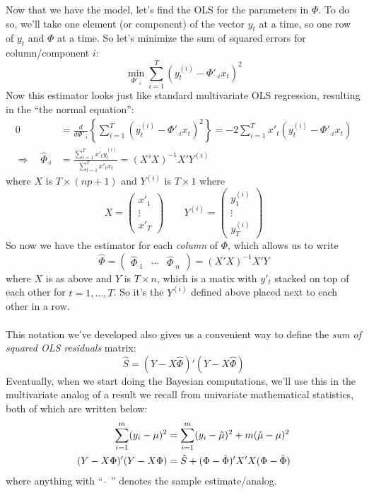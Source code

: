 \documentclass[a4paper,12pt]{scrartcl}
\begin{document}
Now that we have the model, let's find the OLS for 
the parameters in $\Phi$. To do so, we'll take one element (or
component) of the vector $y_t$ at a time, so one row of $y_t$
and $\Phi$ at a time. So let's minimize the sum of
squared errors for column/component $i$: 
\begin{equation}
    \min_{\Phi'_{\cdot i}} \sum^T_{i=1} 
	\left(y_t^{(i)} - \Phi'_{\cdot i} x_t \right)^2
\end{equation}
Now this estimator looks just like standard multivariate OLS 
regression, resulting in the ``the normal equation'':
\begin{align*}
    0 &= \frac{d}{d\Phi'_{\cdot i}}\left\{ \sum^T_{i=1} 
	\left(y_t^{(i)} - \Phi'_{\cdot i} x_t \right)^2\right\} 
	= -2 \sum^T_{i=1} x'_t
	\left(y_t^{(i)} - \Phi'_{\cdot i} x_t\right) \\
    \Rightarrow \quad \hat{\Phi}_{\cdot i}   &= 
	\frac{\sum^T_{t=1} x'_t y_t^{(i)} }{\sum^T_{t=1} x'_t x_t}
	= (X' X)^{-1} X' Y^{(i)}
\end{align*}
where $X$ is $T \times (np+1)$ and $Y^{(i)}$ is $T \times 1$
where
\begin{equation}
    \label{xy}
     X = \begin{pmatrix} x'_1 \\ \vdots \\ x'_T \end{pmatrix}
	\qquad Y^{(i)} = \begin{pmatrix} y_1^{(i)}  \\
	\vdots \\ y_T^{(i)} \end{pmatrix} 
\end{equation}
So now we have the estimator for each \emph{column}
of $\Phi$, which allows us to write
\begin{equation}
    \label{normaleqn}
    \hat{\Phi} = \begin{pmatrix} \hat{\Phi}_{\cdot 1} & \cdots &
	\hat{\Phi}_{\cdot n} \end{pmatrix}  
	= (X' X)^{-1} X' Y
\end{equation}
where $X$ is as above and $Y$ is $T \times n$, which is 
a matix with $y'_t$ stacked on top of each other for
$t = 1, \ldots, T$.  So it's the $Y^{(i)}$ defined
above placed next to each other in a row.
\\
\\
This notation we've developed also gives us a convenient
way to define the \emph{sum of squared OLS residuals}
matrix:
\begin{equation}
    \hat{S} = (Y - X\hat{\Phi})'(Y - X\hat{\Phi})
\end{equation}
Eventually, when we start doing the Bayesian computations, 
we'll use this in the multivariate analog of a result
we recall from univariate mathematical statistics, 
both of which are written below:
\begin{align}
    \sum^m_{i=1} (y_i - \mu)^2 &= \sum^m_{i=1} (y_i - \hat{\mu})^2
	+ m(\hat{\mu}-\mu)^2 \notag \\
    (Y - X\Phi)'(Y - X\Phi) &= \hat{S} + (\Phi - \hat{\Phi})'
	X'X(\Phi - \hat{\Phi}) \label{sumsq}
\end{align}
where anything with ``$\;\hat{\;}\;$'' denotes the sample
estimate/analog.
\end{document}
